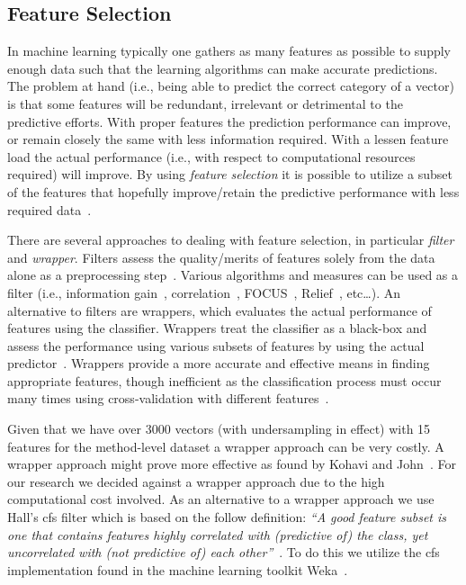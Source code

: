 \subsection{Feature Selection}
\label{subsec:experiment_feature_selection}
In machine learning typically one gathers as many features as possible to supply enough data such that the learning algorithms can make accurate predictions. The problem at hand (i.e., being able to predict the correct category of a vector) is that some features will be redundant, irrelevant or detrimental to the predictive efforts. With proper features the prediction performance can improve, or remain closely the same with less information required. With a lessen feature load the actual performance (i.e., with respect to computational resources required) will improve. By using \emph{feature selection} it is possible to utilize a subset of the features that hopefully improve/retain the predictive performance with less required data~\cite{GE03,BL97}.

There are several approaches to dealing with feature selection, in particular \emph{filter} and \emph{wrapper}. Filters assess the quality/merits of features solely from the data alone as a preprocessing step~\cite{JKP94,BL97}. Various algorithms and measures can be used as a filter (i.e., information gain~\cite{GE03}, correlation~\cite{Hal99}, FOCUS~\cite{AD91}, Relief~\cite{KR92}, etc\ldots). An alternative to filters are wrappers, which evaluates the actual performance of features using the classifier. Wrappers treat the classifier as a black-box and assess the performance using various subsets of features by using the actual predictor~\cite{JKP94,BL97}. Wrappers provide a more accurate and effective means in finding appropriate features, though inefficient as the classification process must occur many times using cross-validation with different features~\cite{KJ97}.

Given that we have over 3000 vectors (with undersampling in effect) with 15 features for the method-level dataset a wrapper approach can be very costly. A wrapper approach might prove more effective as found by Kohavi and John~\cite{KJ97}. For our research we decided against a wrapper approach due to the high computational cost involved. As an alternative to a wrapper approach we use Hall's \gls{cfs} filter which is based on the follow definition: \emph{``A good feature subset is one that contains features highly correlated with (predictive of) the class, yet uncorrelated with (not predictive of) each other''}~\cite{Hal99}. To do this we utilize the \gls{cfs} implementation found in the machine learning toolkit Weka~\cite{HFH+09}.

